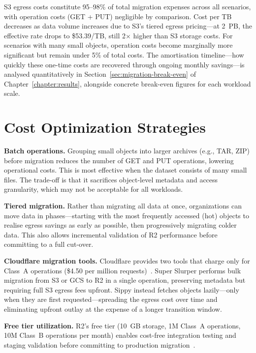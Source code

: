 S3 egress costs constitute 95--98\% of total migration expenses across all scenarios, with operation costs (GET + PUT) negligible by comparison. Cost per TB decreases as data volume increases due to S3's tiered egress pricing---at 2~PB, the effective rate drops to \$53.39/TB, still 2$\times$ higher than S3 storage costs. For scenarios with many small objects, operation costs become marginally more significant but remain under 5\% of total costs. The amortisation timeline---how quickly these one-time costs are recovered through ongoing monthly savings---is analysed quantitatively in Section~\ref{sec:migration-break-even} of Chapter~\ref{chapter:results}, alongside concrete break-even figures for each workload scale.

\section{Cost Optimization Strategies}\label{sec:optimization}

\textbf{Batch operations.} Grouping small objects into larger archives (e.g., TAR, ZIP) before migration reduces the number of GET and PUT operations, lowering operational costs. This is most effective when the dataset consists of many small files. The trade-off is that it sacrifices object-level metadata and access granularity, which may not be acceptable for all workloads.

\textbf{Tiered migration.} Rather than migrating all data at once, organizations can move data in phases---starting with the most frequently accessed (hot) objects to realise egress savings as early as possible, then progressively migrating colder data. This also allows incremental validation of R2 performance before committing to a full cut-over.

\textbf{Cloudflare migration tools.} Cloudflare provides two tools that charge only for Class~A operations (\$4.50 per million requests)~\cite{cloudflare-super-slurper,cloudflare-sippy}. Super Slurper performs bulk migration from S3 or GCS to R2 in a single operation, preserving metadata but requiring full S3 egress fees upfront. Sippy instead fetches objects lazily---only when they are first requested---spreading the egress cost over time and eliminating upfront outlay at the expense of a longer transition window.

\textbf{Free tier utilization.} R2's free tier (10~GB storage, 1M Class~A operations, 10M Class~B operations per month) enables cost-free integration testing and staging validation before committing to production migration~\cite{cloudflare-r2-pricing}.
